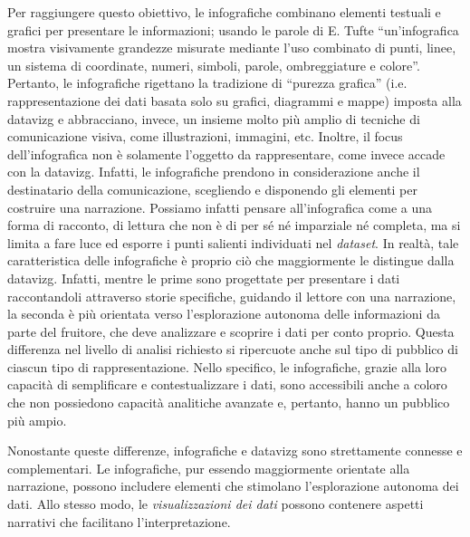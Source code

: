 Per raggiungere questo obiettivo, le infografiche combinano elementi testuali e grafici per presentare le informazioni; usando le parole di E. Tufte ``un'infografica mostra visivamente grandezze misurate mediante 
l'uso combinato di punti, linee, un sistema di coordinate, numeri, simboli, parole, ombreggiature e colore''. Pertanto, le infografiche rigettano la tradizione di ``purezza grafica'' (i.e. rappresentazione dei dati 
basata solo su grafici, diagrammi e mappe) imposta alla \gls{datavizg} e abbracciano, invece, un insieme molto più amplio di tecniche di comunicazione visiva, come illustrazioni, immagini, etc.
Inoltre, il focus dell'infografica non è solamente l'oggetto da rappresentare, come invece accade con la \gls{datavizg}. Infatti, le infografiche
prendono in considerazione anche il destinatario della comunicazione, scegliendo e disponendo gli elementi per costruire una narrazione.
Possiamo infatti pensare all'infografica come a una forma di racconto, di lettura che non è di per sé né imparziale né completa, ma si limita a fare luce ed esporre i punti salienti individuati nel \emph{dataset}.
In realtà, tale caratteristica delle infografiche è proprio ciò che maggiormente le distingue dalla \gls{datavizg}. Infatti, mentre le prime sono progettate per presentare i dati raccontandoli attraverso storie specifiche, guidando il lettore con una narrazione, la seconda
è più orientata verso l'esplorazione autonoma delle informazioni da parte del fruitore, che deve analizzare e scoprire i dati per conto proprio. 
Questa differenza nel livello di analisi richiesto si ripercuote anche sul tipo di pubblico di ciascun tipo di rappresentazione. Nello specifico, le infografiche, grazie alla loro capacità di semplificare e contestualizzare i dati, sono accessibili anche a coloro
che non possiedono capacità analitiche avanzate e, pertanto, hanno un pubblico più ampio. 

Nonostante queste differenze, infografiche e \gls{datavizg} sono strettamente connesse e complementari. Le infografiche, pur essendo maggiormente orientate alla narrazione, 
possono includere elementi che stimolano l'esplorazione autonoma dei dati. Allo stesso modo, le \emph{visualizzazioni dei dati} possono contenere aspetti narrativi che facilitano 
l'interpretazione.


